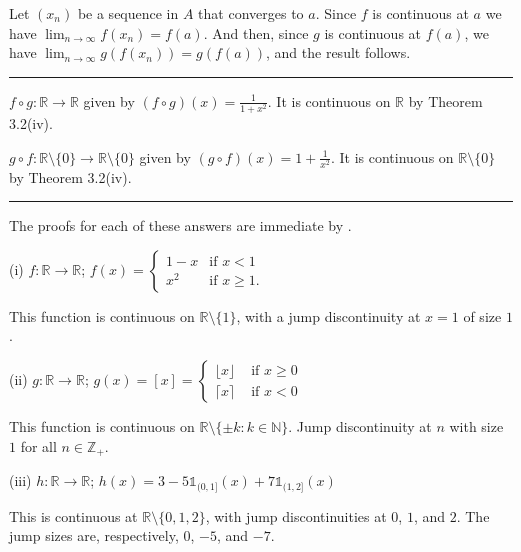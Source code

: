 \documentclass[letterpaper,10pt,english]{jupyterBook}
\begin{document}
\sphinxAtStartPar
{\hyperref[\detokenize{Problems:id15}]{}} Let \((x_{n})\) be a sequence in \(A\) that converges to \(a\). Since \(f\) is continuous at \(a\) we have \(\lim_{n\rightarrow\infty} f(x_{n}) = f(a)\). And then, since \(g\) is continuous at \(f(a)\), we have \(\lim_{n\rightarrow\infty} g(f(x_{n})) = g(f(a))\), and the result follows.


\bigskip\hrule\bigskip


\sphinxAtStartPar
{\hyperref[\detokenize{Problems:id16}]{}} \(f \circ g:\mathbb{R}\to \mathbb{R}\) given by \((f \circ g)(x) = \frac{1}{1  + x^{2}}\). It is continuous on \(\mathbb{R}\) by Theorem 3.2(iv).

\(g \circ f:\mathbb{R} \setminus \{0\} \to \mathbb{R} \setminus \{0\}\) given by \((g \circ f)(x) = {1  + \frac{1}{x^2}}\). It is continuous on \(\mathbb{R} \setminus \{0\}\) by Theorem 3.2(iv).


\bigskip\hrule\bigskip


\sphinxAtStartPar
{\hyperref[\detokenize{Problems:id17}]{}}
The proofs for each of these answers are immediate by {\hyperref[\detokenize{Problems:id8}]{}}.

\sphinxAtStartPar
(i) \(f:\mathbb{R}\to\mathbb{R}\); \(f(x) = \begin{cases} 1 -x & \text{if }x < 1\\ x^{2}& \text{if }x \geq 1. \end{cases}\)

\sphinxAtStartPar
This function is continuous on \(\mathbb{R} \setminus \{1\}\), with a jump discontinuity at \(x=1\) of size \(1\).

\sphinxAtStartPar
(ii) \(g:\mathbb{R}\to\mathbb{R}\); \(g(x) = [x] = \left\{\begin{array}{cl} \lfloor x\rfloor & \text{ if } x\geq 0 \\ \lceil x \rceil & \text{ if } x<0 \end{array}\right.\)

\sphinxAtStartPar
This function is continuous on \(\mathbb{R}\setminus\{\pm k: k\in\mathbb{N}\}\). Jump discontinuity at \(n\) with size \(1\) for all \(n\in\mathbb{Z}_+\).

\sphinxAtStartPar
(iii) \(h:\mathbb{R}\to\mathbb{R}\); \(h(x) =3 - 5\mathbb{1}_{(0, 1]}(x) + 7\mathbb{1}_{(1, 2]}(x)\)

\sphinxAtStartPar
This is continuous at \(\mathbb{R} \setminus \{0,1,2\}\), with jump discontinuities at \(0\), \(1\), and \(2\). The jump sizes are, respectively, \(0\), \(-5\), and \(-7\).
\end{document}
